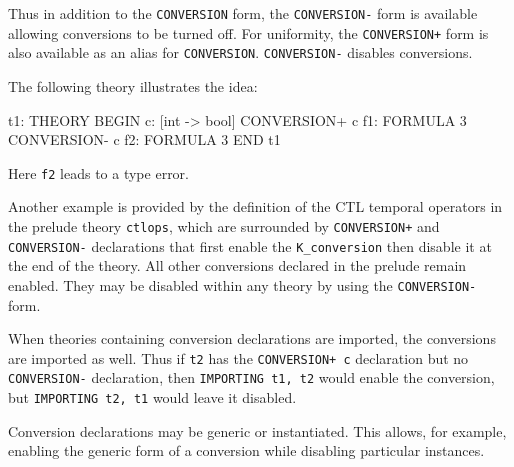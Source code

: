 Thus in addition to the \texttt{CONVERSION} form, the \texttt{CONVERSION-}
form is available allowing conversions to be turned off.  For uniformity,
the \texttt{CONVERSION+} form is also available as an alias for
\texttt{CONVERSION}.  \texttt{CONVERSION-} disables conversions.

The following theory illustrates the idea:
\begin{session}
  t1: THEORY
  BEGIN
   c: [int -> bool]
   CONVERSION+ c
   f1: FORMULA 3
   CONVERSION- c
   f2: FORMULA 3
  END t1
\end{session}
Here \texttt{f2} leads to a type error.

Another example is provided by the definition of the CTL temporal
operators in the prelude theory \texttt{ctlops}, which are surrounded by
\texttt{CONVERSION+} and \texttt{CONVERSION-} declarations that first
enable the \texttt{K\_conversion} then disable it at the end of the
theory.  All other conversions declared in the prelude remain enabled.
They may be disabled within any theory by using the \texttt{CONVERSION-}
form.

When theories containing conversion declarations are imported, the
conversions are imported as well.  Thus if \texttt{t2} has the
\texttt{CONVERSION+ c} declaration but no \texttt{CONVERSION-}
declaration, then \texttt{IMPORTING t1, t2} would enable the conversion,
but \texttt{IMPORTING t2, t1} would leave it disabled.

Conversion declarations may be generic or instantiated.  This
allows, for example, enabling the generic form of a conversion while
disabling particular instances.

